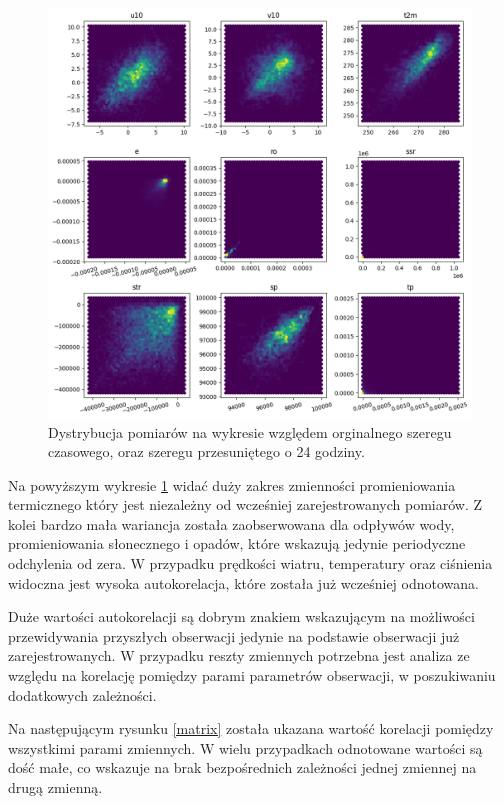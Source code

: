 \begin{figure}[H]
    \centering
    \includegraphics[width=\textwidth]{images/autocorrelation_hex.png}
    \caption{Dystrybucja pomiarów na wykresie względem orginalnego szeregu czasowego,
    oraz szeregu przesuniętego o 24 godziny.}
    \label{hex}
\end{figure}

Na powyższym wykresie \ref{hex} widać duży zakres zmienności promieniowania termicznego
który jest niezależny od wcześniej zarejestrowanych pomiarów. Z kolei bardzo mała wariancja 
została zaobserwowana dla odpływów wody, promieniowania słonecznego i opadów, które wskazują 
jedynie periodyczne odchylenia od zera. W przypadku prędkości wiatru, temperatury oraz 
ciśnienia widoczna jest wysoka autokorelacja, które została już wcześniej odnotowana. 

Duże wartości autokorelacji są dobrym znakiem wskazującym na możliwości przewidywania przyszłych
obserwacji jedynie na podstawie obserwacji już zarejestrowanych. W przypadku reszty zmiennych
potrzebna jest analiza ze względu na korelację pomiędzy parami parametrów obserwacji, w 
poszukiwaniu dodatkowych zależności.

Na następującym rysunku \ref{matrix} została ukazana wartość korelacji pomiędzy wszystkimi 
parami zmiennych. W wielu przypadkach odnotowane wartości są dość małe, co wskazuje na brak
bezpośrednich zależności jednej zmiennej na drugą zmienną. 

